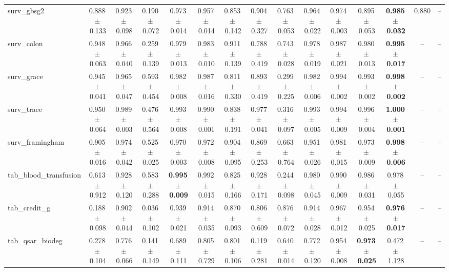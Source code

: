 \documentclass[8pt]{extarticle}
\begin{document}
\begin{longtable}{l*{14}{c}}
surv\_gbsg2 & 0.888\,$\pm$\,0.133 & 0.923\,$\pm$\,0.098 & 0.190\,$\pm$\,0.072 & 0.973\,$\pm$\,0.014 & 0.957\,$\pm$\,0.014 & 0.853\,$\pm$\,0.142 & 0.904\,$\pm$\,0.327 & 0.763\,$\pm$\,0.053 & 0.964\,$\pm$\,0.022 & 0.974\,$\pm$\,0.003 & 0.895\,$\pm$\,0.053 & \textbf{0.985\,$\pm$\,0.032} & 0.880 & -- \\
surv\_colon & 0.948\,$\pm$\,0.063 & 0.966\,$\pm$\,0.040 & 0.259\,$\pm$\,0.139 & 0.979\,$\pm$\,0.013 & 0.983\,$\pm$\,0.010 & 0.911\,$\pm$\,0.139 & 0.788\,$\pm$\,0.419 & 0.743\,$\pm$\,0.028 & 0.978\,$\pm$\,0.019 & 0.987\,$\pm$\,0.021 & 0.980\,$\pm$\,0.013 & \textbf{0.995\,$\pm$\,0.017} & -- & -- \\
surv\_grace & 0.945\,$\pm$\,0.041 & 0.965\,$\pm$\,0.047 & 0.593\,$\pm$\,0.454 & 0.982\,$\pm$\,0.008 & 0.987\,$\pm$\,0.016 & 0.811\,$\pm$\,0.330 & 0.893\,$\pm$\,0.419 & 0.299\,$\pm$\,0.225 & 0.982\,$\pm$\,0.006 & 0.994\,$\pm$\,0.002 & 0.993\,$\pm$\,0.002 & \textbf{0.998\,$\pm$\,0.002} & -- & -- \\
surv\_trace & 0.950\,$\pm$\,0.064 & 0.989\,$\pm$\,0.003 & 0.476\,$\pm$\,0.564 & 0.993\,$\pm$\,0.008 & 0.990\,$\pm$\,0.001 & 0.838\,$\pm$\,0.191 & 0.977\,$\pm$\,0.041 & 0.316\,$\pm$\,0.097 & 0.993\,$\pm$\,0.005 & 0.994\,$\pm$\,0.009 & 0.996\,$\pm$\,0.004 & \textbf{1.000\,$\pm$\,0.001} & -- & -- \\
surv\_framingham & 0.905\,$\pm$\,0.016 & 0.974\,$\pm$\,0.042 & 0.525\,$\pm$\,0.025 & 0.970\,$\pm$\,0.003 & 0.972\,$\pm$\,0.008 & 0.904\,$\pm$\,0.095 & 0.869\,$\pm$\,0.253 & 0.663\,$\pm$\,0.764 & 0.951\,$\pm$\,0.026 & 0.981\,$\pm$\,0.015 & 0.973\,$\pm$\,0.009 & \textbf{0.998\,$\pm$\,0.006} & -- & -- \\
tab\_blood\_transfusion & 0.613\,$\pm$\,0.912 & 0.928\,$\pm$\,0.120 & 0.583\,$\pm$\,0.288 & \textbf{0.995\,$\pm$\,0.009} & 0.992\,$\pm$\,0.015 & 0.825\,$\pm$\,0.166 & 0.928\,$\pm$\,0.171 & 0.244\,$\pm$\,0.098 & 0.980\,$\pm$\,0.045 & 0.990\,$\pm$\,0.009 & 0.986\,$\pm$\,0.031 & 0.978\,$\pm$\,0.055 & -- & -- \\
tab\_credit\_g & 0.188\,$\pm$\,0.098 & 0.902\,$\pm$\,0.044 & 0.036\,$\pm$\,0.102 & 0.939\,$\pm$\,0.021 & 0.914\,$\pm$\,0.035 & 0.870\,$\pm$\,0.093 & 0.806\,$\pm$\,0.609 & 0.876\,$\pm$\,0.072 & 0.914\,$\pm$\,0.028 & 0.967\,$\pm$\,0.012 & 0.954\,$\pm$\,0.025 & \textbf{0.976\,$\pm$\,0.017} & -- & -- \\
tab\_qsar\_biodeg & 0.278\,$\pm$\,0.104 & 0.776\,$\pm$\,0.066 & 0.141\,$\pm$\,0.149 & 0.689\,$\pm$\,0.111 & 0.805\,$\pm$\,0.729 & 0.801\,$\pm$\,0.106 & 0.119\,$\pm$\,0.281 & 0.640\,$\pm$\,0.014 & 0.772\,$\pm$\,0.120 & 0.954\,$\pm$\,0.008 & \textbf{0.973\,$\pm$\,0.025} & 0.472\,$\pm$\,1.128 & -- & -- \\

\end{longtable}
\end{document}
